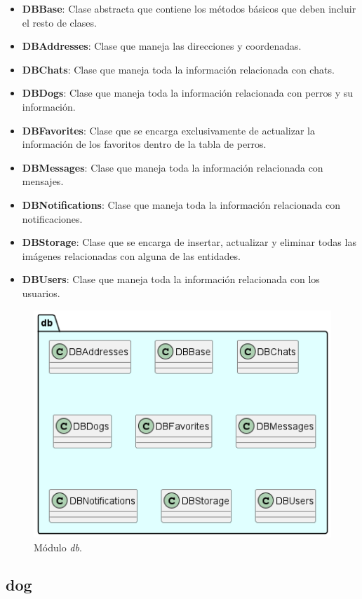 \documentclass[a4paper, 12pt]{article}
\begin{document}
\begin{itemize}[noitemsep]
	\item \textbf{DBBase}: Clase abstracta que contiene los métodos básicos que deben incluir el resto de clases.
	\item \textbf{DBAddresses}: Clase que maneja las direcciones y coordenadas.
	\item \textbf{DBChats}: Clase que maneja toda la información relacionada con chats.
	\item \textbf{DBDogs}: Clase que maneja toda la información relacionada con perros y su información.
	\item \textbf{DBFavorites}: Clase que se encarga exclusivamente de actualizar la información de los favoritos dentro de la tabla de perros.
	\item \textbf{DBMessages}: Clase que maneja toda la información relacionada con mensajes.
	\item \textbf{DBNotifications}: Clase que maneja toda la información relacionada con notificaciones.
	\item \textbf{DBStorage}: Clase que se encarga de insertar, actualizar y eliminar todas las imágenes relacionadas con alguna de las entidades.
	\item \textbf{DBUsers}: Clase que maneja toda la información relacionada con los usuarios.
\end{itemize}

\begin{figure}[H]
	\begin{center}
		{\includegraphics[width=0.7\linewidth]{diagram/DB.png}\par}
		\caption{Módulo  \textit{db}.}
	\end{center}
\end{figure}


\subsection*{dog}
\end{document}
